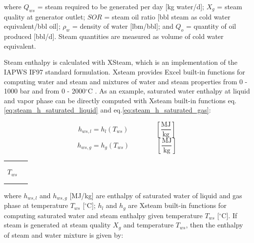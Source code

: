 \documentclass[11pt]{report}
\newcommand{\xlname}[1]{\raisebox{1pt}{\fcolorbox{light-gray}{light-gray}{\texttt{\textcolor{stanford}{\scriptsize{#1}}}}}}
\newcommand{\eqnunitfrac}[2]{\quad\quad \scriptstyle{\left[\frac{\text{#1}}{\text{#2}}\right]}}
\begin{document}
where $Q_{ws}$ = steam required to be generated per day [kg water/d]; $X_{g}$ = steam quality at generator outlet; $SOR$ = steam oil ratio [bbl steam as cold water equivalent/bbl oil]; $\rho_w$ = density of water [lbm/bbl]; and $Q_o$ = quantity of oil produced [bbl/d]. Steam quantities are measured as volume of cold water equivalent.

Steam enthalpy is calculated with XSteam, which is an implementation of the IAPWS IF97 standard formulation. Xsteam provides Excel built-in functions for computing water and steam and mixtures of water and steam properties from 0 - 1000 bar and from 0 - 2000$^\circ$C \cite{Knovel}. As an example, saturated water enthalpy at liquid and vapor phase can be directly computed with Xsteam built-in functions eq.\eqref{eq:steam_h_saturated_liquid} and eq.\eqref{eq:steam_h_saturated_gas}:

\begin{minipage}{0.6\columnwidth}
\begin{fleqn}[0pt]
\begin{equation}\label{eq:steam_h_saturated_liquid}
h_{ws,l} = h_{l}(T_{ws}) \quad\quad\eqnunitfrac{MJ}{kg}
\end{equation}
\begin{equation}\label{eq:steam_h_saturated_gas}
h_{ws,g} = h_{g}(T_{ws}) \quad\quad\eqnunitfrac{MJ}{kg}
\end{equation}
\end{fleqn}
\end{minipage}\hfill
\begin{minipage}{0.3\columnwidth}
        \begin{tabular}{|cl}
                        & \\
                        & \\
        $T_{ws}$       & \xlname{temperature\_mixed\_steam}\\ 
                        & \\
                        & \\
        \end{tabular}
\end{minipage}

where $h_{ws,l}$ and $h_{ws,g}$ [MJ/kg] are enthalpy of saturated water of liquid and gas phase at temperature $T_{ws}$ [$^\circ$C]; $h_{l}$ and $h_{g}$ are Xsteam built-in functions for computing saturated water and steam enthalpy given temperature $T_{ws}$ [$^\circ$C]. If steam is generated at steam quality $X_{g}$ and temperature $T_{ws}$, then the enthalpy of steam and water mixture is given by:
\end{document}
